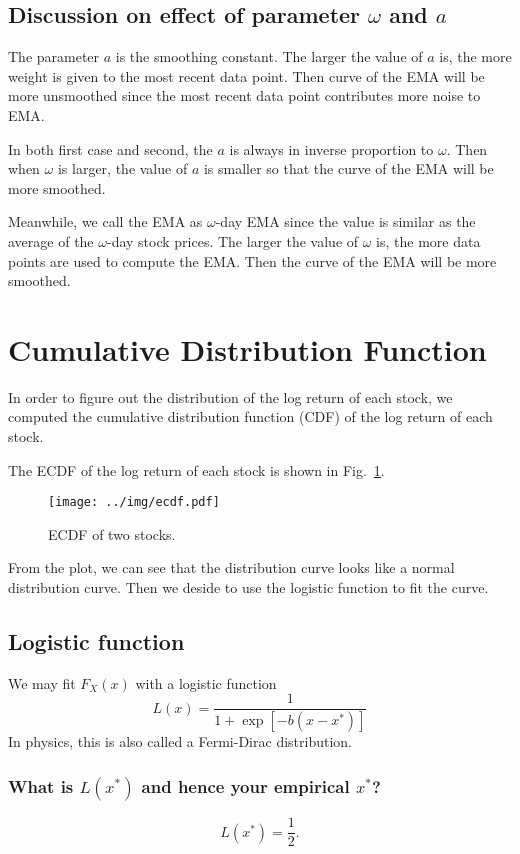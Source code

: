 \documentclass[runningheads]{llncs}
\begin{document}
\subsection{Discussion on effect of parameter $\omega$ and $a$}

The parameter $a$ is the smoothing constant. The larger the value of $a$ is, the more weight is given to the most recent data point.
Then curve of the EMA will be more unsmoothed since the most recent data point contributes more noise to EMA.

In both first case and second, the $a$ is always in inverse proportion to $\omega$. Then when $\omega$ is larger, the value of $a$ is smaller so that the curve of the EMA will be more smoothed.

Meanwhile, we call the EMA as $\omega$-day EMA since the value is similar as the average of the $\omega$-day stock prices.
The larger the value of $\omega$ is, the more data points are used to compute the EMA. Then the curve of the EMA will be more smoothed.

\section{Cumulative Distribution Function}

In order to figure out the distribution of the log return of each stock, we computed the  cumulative distribution function (CDF) of the log return of each stock.

The ECDF of the log return of each stock is shown in Fig.~\ref{fig:ecdf}.

\begin{figure}
    \centering
    \texttt{[image: ../img/ecdf.pdf]}
    \caption{ECDF of two stocks.}
    \label{fig:ecdf}
\end{figure}


From the plot, we can see that the distribution curve looks like a normal distribution curve.
Then we deside to use the logistic function to fit the curve.

\subsection{Logistic function}
We may fit $F_X (x)$ with a logistic function
\begin{equation}
    L(x) = \frac1{1 + \exp[-b(x-x^*)]}
\end{equation}
In physics, this is also called a Fermi-Dirac distribution.
\subsubsection*{What is $L(x^*)$ and hence your empirical $x^*$?}
$$
    L(x^*) = \frac12 .
$$
\end{document}
